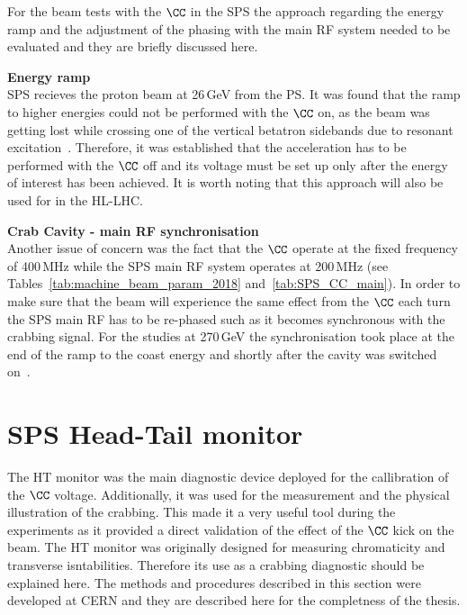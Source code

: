 For the beam tests with the $\CC$ in the SPS the approach regarding the energy ramp and the adjustment of the phasing with the main RF system needed to be evaluated and they are briefly discussed here.


\normalsize{\textbf{Energy ramp}}\\
SPS recieves the proton beam at 26\,GeV from the PS. It was found that the ramp to higher energies could not be performed with the $\CC$ on, as the beam was getting lost while crossing one of the vertical betatron sidebands due to resonant excitation~\cite{Rama_Paris_persentation}. Therefore, it was established that the acceleration has to be performed with the $\CC$ off and its voltage must be set up only after the energy of interest has been achieved. It is worth noting that this approach will also be used for in the HL-LHC.

\normalsize{\textbf{Crab Cavity - main RF synchronisation}}\\
Another issue of concern was the fact that the $\CC$ operate at the fixed frequency of 400\,MHz while the SPS main RF system operates at 200\,MHz (see Tables~\ref{tab:machine_beam_param_2018} and~\ref{tab:SPS_CC_main}).
In order to make sure that the beam will experience the same effect from the $\CC$ each turn the SPS main RF has to be re-phased such as it becomes synchronous with the crabbing signal. For the studies at 270\,GeV the synchronisation took place at the end of the ramp to the coast energy and shortly after the cavity was switched on~\cite{BE_seminar}.


\section{SPS Head-Tail monitor}\label{sec:HT_info}
The HT monitor was the main diagnostic device deployed for the callibration of the $\CC$ voltage. Additionally, it was used for the measurement and the physical illustration of the crabbing. This made it a very useful tool during the experiments as it provided a direct validation of the effect of the $\CC$ kick on the beam. The HT monitor was originally designed for measuring chromaticity and transverse isntabilities. Therefore its use as a crabbing diagnostic should be explained here. The methods and procedures described in this section were developed at CERN and they are described here for the completness of the thesis.

